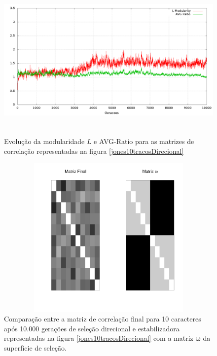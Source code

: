 \begin{figure}[htbp]
    \centering
    \includegraphics[width=150mm, height=80mm]{figuras/jones10tracosDirecionalStats.png}
    \caption{Evolução da modularidade $L$ e AVG-Ratio para as matrizes de
    correlação representadas na figura \ref{jones10tracosDirecional}}
    \label{jones10tracosDirecionalStats}
\end{figure}

\begin{figure}[htbp]
    \centering
    \includegraphics[width=150mm, height=80mm]{figuras/Mat10tracosDirecional}
    \caption{Comparação entre a matriz de correlação final para 10 caracteres
        após 10.000 gerações de seleção direcional e estabilizadora
        representadas na figura \ref{jones10tracosDirecional} com a matriz
    $\pmb{\omega}$ da superfície de seleção.}
    \label{MatJones10tracosDirecional}
\end{figure}


